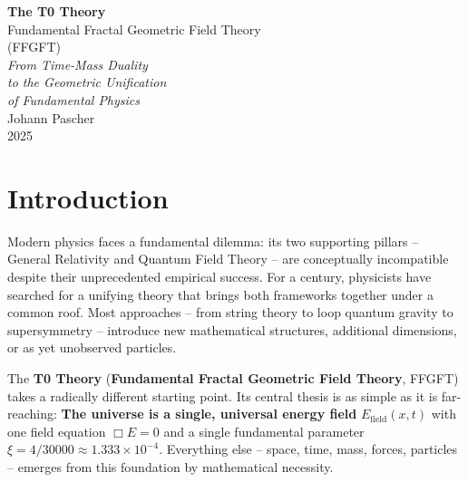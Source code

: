 \documentclass[11pt,oneside]{book}
\begin{document}
\frontmatter
\pagestyle{fancy}
\makeatletter
\let\ps@plain\ps@fancy
\let\ps@empty\ps@fancy
\makeatother

\begin{titlepage}
	\centering
	\vspace*{2cm}
	
	{\Huge\bfseries The T0 Theory}\\[0.8cm]
	{\LARGE Fundamental Fractal Geometric Field Theory}\\[0.5cm]
	{\LARGE (FFGFT)}\\[1.5cm]
	
	{\Large\itshape From Time-Mass Duality\\[0.3cm]
		to the Geometric Unification\\[0.3cm]
		of Fundamental Physics}\\[2cm]
	
	{\large Johann Pascher}\\[1cm]
	
	{\large 2025}
	
	\vfill
\end{titlepage}

\chapter*{Introduction}

Modern physics faces a fundamental dilemma: its two supporting pillars -- General Relativity and Quantum Field Theory -- are conceptually incompatible despite their unprecedented empirical success. For a century, physicists have searched for a unifying theory that brings both frameworks together under a common roof. Most approaches -- from string theory to loop quantum gravity to supersymmetry -- introduce new mathematical structures, additional dimensions, or as yet unobserved particles.

The \textbf{T0 Theory} (\textbf{Fundamental Fractal Geometric Field Theory}, FFGFT) takes a radically different starting point. Its central thesis is as simple as it is far-reaching: \textbf{The universe is a single, universal energy field} $E_{\text{field}}(x,t)$ with one field equation $\Box E = 0$ and a single fundamental parameter $\xi = 4/30000 \approx 1.333 \times 10^{-4}$. Everything else -- space, time, mass, forces, particles -- emerges from this foundation by mathematical necessity.
\end{document}

